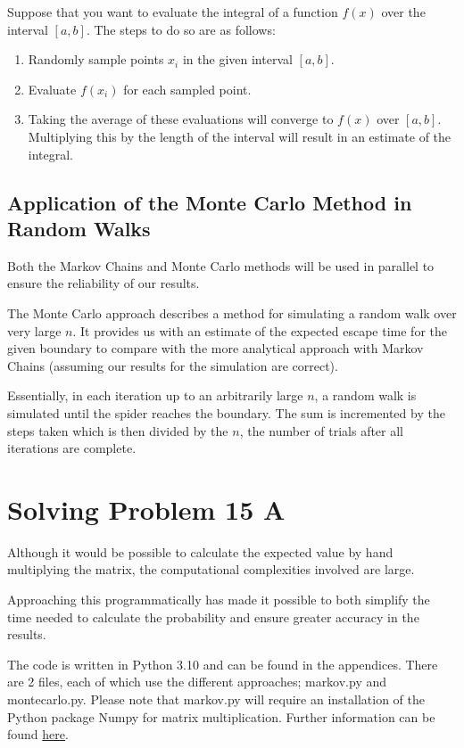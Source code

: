 \documentclass[12pt,a4paper]{article}
\begin{document}
Suppose that you want to evaluate the integral of a function \(f(x)\) over the interval \([a,b]\).
The steps to do so are as follows:

\begin{enumerate}
    \item Randomly sample points \(x_i\) in the given interval \([a,b]\).
    \item Evaluate \(f(x_i)\) for each sampled point.
    \item Taking the average of these evaluations will converge to \(f(x)\) over \([a,b]\). Multiplying this by the length of the interval will result in an estimate of the integral. 
\end{enumerate}

\subsection{Application of the Monte Carlo Method in Random Walks}
Both the Markov Chains and Monte Carlo methods will be used in parallel to ensure the reliability of our results.

The Monte Carlo approach describes a method for simulating a random walk over very large \(n\). It provides us with an estimate of the expected escape time for the given boundary to compare with the more analytical approach with Markov Chains (assuming our results for the simulation are correct). 

Essentially, in each iteration up to an arbitrarily large \(n\), a random walk is simulated until the spider reaches the boundary. The sum is incremented by the steps taken which is then divided by the \(n\), the number of trials after all iterations are complete.

\section{Solving Problem 15 A}

Although it would be possible to calculate the expected value by hand multiplying the matrix, the computational complexities involved are large.

Approaching this programmatically has made it possible to both simplify the time needed to calculate the probability and ensure greater accuracy in the results.

The code is written in Python 3.10 and can be found in the appendices. There are 2 files, each of which use the different approaches; markov.py and montecarlo.py. Please note that markov.py will require an installation of the Python package Numpy for matrix multiplication. Further information can be found \href{https://phoenixnap.com/kb/install-numpy}{here}.
\end{document}
